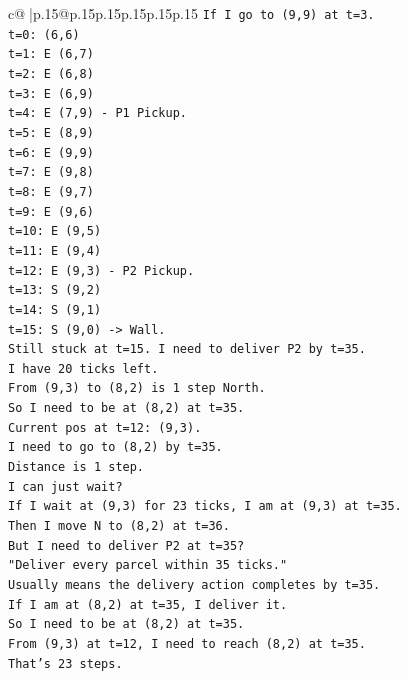 \documentclass{article}
\begin{document}
{\begin{supertabular}{c@{$\;$}|p{.15\linewidth}@{}p{.15\linewidth}p{.15\linewidth}p{.15\linewidth}p{.15\linewidth}p{.15\linewidth}}
{{{\texttt{If I go to (9,9) at t=3.} \\
\texttt{t=0: (6,6)} \\
\texttt{t=1: E (6,7)} \\
\texttt{t=2: E (6,8)} \\
\texttt{t=3: E (6,9)} \\
\texttt{t=4: E (7,9) {-} P1 Pickup.} \\
\texttt{t=5: E (8,9)} \\
\texttt{t=6: E (9,9)} \\
\texttt{t=7: E (9,8)} \\
\texttt{t=8: E (9,7)} \\
\texttt{t=9: E (9,6)} \\
\texttt{t=10: E (9,5)} \\
\texttt{t=11: E (9,4)} \\
\texttt{t=12: E (9,3) {-} P2 Pickup.} \\
\texttt{t=13: S (9,2)} \\
\texttt{t=14: S (9,1)} \\
\texttt{t=15: S (9,0) {-}> Wall.} \\
\texttt{Still stuck at t=15. I need to deliver P2 by t=35.} \\
\texttt{I have 20 ticks left.} \\
\texttt{From (9,3) to (8,2) is 1 step North.} \\
\texttt{So I need to be at (8,2) at t=35.} \\
\texttt{Current pos at t=12: (9,3).} \\
\texttt{I need to go to (8,2) by t=35.} \\
\texttt{Distance is 1 step.} \\
\texttt{I can just wait?} \\
\texttt{If I wait at (9,3) for 23 ticks, I am at (9,3) at t=35.} \\
\texttt{Then I move N to (8,2) at t=36.} \\
\texttt{But I need to deliver P2 at t=35?} \\
\texttt{"Deliver every parcel within 35 ticks."} \\
\texttt{Usually means the delivery action completes by t=35.} \\
\texttt{If I am at (8,2) at t=35, I deliver it.} \\
\texttt{So I need to be at (8,2) at t=35.} \\
\texttt{From (9,3) at t=12, I need to reach (8,2) at t=35.} \\
\texttt{That's 23 steps.} \\
}}}
\end{supertabular}}
\end{document}
